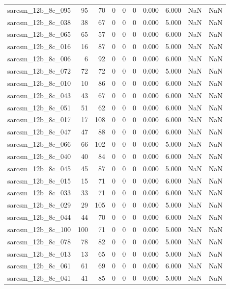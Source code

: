 \documentclass{article}
\begin{document}
\begin{longtable}{lrrrrrrrrr}
sarcsm\_12b\_8c\_095 & 95 & 70 & 0 & 0 & 0 & 0.000 & 6.000 & NaN & NaN \\
sarcsm\_12b\_8c\_038 & 38 & 67 & 0 & 0 & 0 & 0.000 & 5.000 & NaN & NaN \\
sarcsm\_12b\_8c\_065 & 65 & 57 & 0 & 0 & 0 & 0.000 & 6.000 & NaN & NaN \\
sarcsm\_12b\_8c\_016 & 16 & 87 & 0 & 0 & 0 & 0.000 & 5.000 & NaN & NaN \\
sarcsm\_12b\_8c\_006 & 6 & 92 & 0 & 0 & 0 & 0.000 & 6.000 & NaN & NaN \\
sarcsm\_12b\_8c\_072 & 72 & 72 & 0 & 0 & 0 & 0.000 & 5.000 & NaN & NaN \\
sarcsm\_12b\_8c\_010 & 10 & 86 & 0 & 0 & 0 & 0.000 & 6.000 & NaN & NaN \\
sarcsm\_12b\_8c\_043 & 43 & 67 & 0 & 0 & 0 & 0.000 & 6.000 & NaN & NaN \\
sarcsm\_12b\_8c\_051 & 51 & 62 & 0 & 0 & 0 & 0.000 & 6.000 & NaN & NaN \\
sarcsm\_12b\_8c\_017 & 17 & 108 & 0 & 0 & 0 & 0.000 & 6.000 & NaN & NaN \\
sarcsm\_12b\_8c\_047 & 47 & 88 & 0 & 0 & 0 & 0.000 & 6.000 & NaN & NaN \\
sarcsm\_12b\_8c\_066 & 66 & 102 & 0 & 0 & 0 & 0.000 & 5.000 & NaN & NaN \\
sarcsm\_12b\_8c\_040 & 40 & 84 & 0 & 0 & 0 & 0.000 & 6.000 & NaN & NaN \\
sarcsm\_12b\_8c\_045 & 45 & 87 & 0 & 0 & 0 & 0.000 & 5.000 & NaN & NaN \\
sarcsm\_12b\_8c\_015 & 15 & 71 & 0 & 0 & 0 & 0.000 & 6.000 & NaN & NaN \\
sarcsm\_12b\_8c\_033 & 33 & 71 & 0 & 0 & 0 & 0.000 & 6.000 & NaN & NaN \\
sarcsm\_12b\_8c\_029 & 29 & 105 & 0 & 0 & 0 & 0.000 & 5.000 & NaN & NaN \\
sarcsm\_12b\_8c\_044 & 44 & 70 & 0 & 0 & 0 & 0.000 & 6.000 & NaN & NaN \\
sarcsm\_12b\_8c\_100 & 100 & 71 & 0 & 0 & 0 & 0.000 & 5.000 & NaN & NaN \\
sarcsm\_12b\_8c\_078 & 78 & 82 & 0 & 0 & 0 & 0.000 & 5.000 & NaN & NaN \\
sarcsm\_12b\_8c\_013 & 13 & 65 & 0 & 0 & 0 & 0.000 & 5.000 & NaN & NaN \\
sarcsm\_12b\_8c\_061 & 61 & 69 & 0 & 0 & 0 & 0.000 & 6.000 & NaN & NaN \\
sarcsm\_12b\_8c\_041 & 41 & 85 & 0 & 0 & 0 & 0.000 & 5.000 & NaN & NaN \\

\end{longtable}
\end{document}
